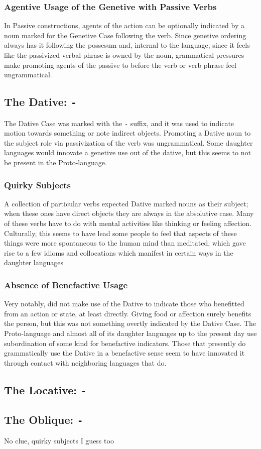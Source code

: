   \subsubsection{Agentive Usage of the Genetive with Passive Verbs}
  In Passive constructions, agents of the action can be optionally indicated by a noun marked for the Genetive Case following the verb. Since genetive ordering always has it following the possesum and, internal to the language, since it feels like the passivized verbal phrase is owned by the noun, grammatical pressures make promoting agents of the passive to before the verb or verb phrase feel ungrammatical.

\subsection{The Dative: \texttt{-\dat}}
The Dative Case was marked with the \texttt{-\dat} suffix, and it was used to indicate motion towards something or note indirect objects. Promoting a Dative noun to the subject role via passivization of the verb was ungrammatical. Some daughter languages would innovate a genetive use out of the dative, but this seems to not be present in the Proto-language.
  \subsubsection{Quirky Subjects}
  A collection of particular verbs expected Dative marked nouns as their subject; when these ones have direct objects they are always in the absolutive case. Many of these verbs have to do with mental activities like thinking or feeling affection. Culturally, this seems to have lead some people to feel that aspects of these things were more spontaneous to the human mind than meditated, which gave rise to a few idioms and collocations which manifest in certain ways in the daughter languages
  \subsubsection{Absence of Benefactive Usage}
  Very notably, \langname did not make use of the Dative to indicate those who benefitted from an action or state, at least directly. Giving food or affection surely benefits the person, but this was not something overtly indicated by the Dative Case. The Proto-language and almost all of its daughter languages up to the present day use subordination of some kind for benefactive indicators. Those that presently do grammatically use the Dative in a benefactive sense seem to have innovated it through contact with neighboring languages that do.


\subsection{The Locative: \texttt{-\loc}}
\subsection{The Oblique: \texttt{-\obl}}
No clue, quirky subjects I guess too
